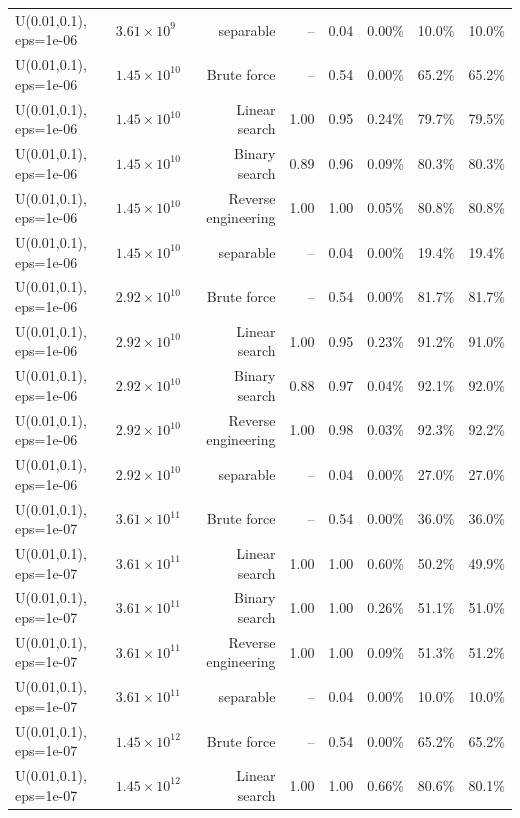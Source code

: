 \begin{tabular}{llrrrrrr}
U(0.01,0.1), eps=1e-06 & $3.61\times 10^{9}$ & separable & -- & 0.04 & 0.00\% & 10.0\% & 10.0\% \\
U(0.01,0.1), eps=1e-06 & $1.45\times 10^{10}$ & Brute force & -- & 0.54 & 0.00\% & 65.2\% & 65.2\% \\
U(0.01,0.1), eps=1e-06 & $1.45\times 10^{10}$ & Linear search & 1.00 & 0.95 & 0.24\% & 79.7\% & 79.5\% \\
U(0.01,0.1), eps=1e-06 & $1.45\times 10^{10}$ & Binary search & 0.89 & 0.96 & 0.09\% & 80.3\% & 80.3\% \\
U(0.01,0.1), eps=1e-06 & $1.45\times 10^{10}$ & Reverse engineering & 1.00 & 1.00 & 0.05\% & 80.8\% & 80.8\% \\
U(0.01,0.1), eps=1e-06 & $1.45\times 10^{10}$ & separable & -- & 0.04 & 0.00\% & 19.4\% & 19.4\% \\
U(0.01,0.1), eps=1e-06 & $2.92\times 10^{10}$ & Brute force & -- & 0.54 & 0.00\% & 81.7\% & 81.7\% \\
U(0.01,0.1), eps=1e-06 & $2.92\times 10^{10}$ & Linear search & 1.00 & 0.95 & 0.23\% & 91.2\% & 91.0\% \\
U(0.01,0.1), eps=1e-06 & $2.92\times 10^{10}$ & Binary search & 0.88 & 0.97 & 0.04\% & 92.1\% & 92.0\% \\
U(0.01,0.1), eps=1e-06 & $2.92\times 10^{10}$ & Reverse engineering & 1.00 & 0.98 & 0.03\% & 92.3\% & 92.2\% \\
U(0.01,0.1), eps=1e-06 & $2.92\times 10^{10}$ & separable & -- & 0.04 & 0.00\% & 27.0\% & 27.0\% \\
U(0.01,0.1), eps=1e-07 & $3.61\times 10^{11}$ & Brute force & -- & 0.54 & 0.00\% & 36.0\% & 36.0\% \\
U(0.01,0.1), eps=1e-07 & $3.61\times 10^{11}$ & Linear search & 1.00 & 1.00 & 0.60\% & 50.2\% & 49.9\% \\
U(0.01,0.1), eps=1e-07 & $3.61\times 10^{11}$ & Binary search & 1.00 & 1.00 & 0.26\% & 51.1\% & 51.0\% \\
U(0.01,0.1), eps=1e-07 & $3.61\times 10^{11}$ & Reverse engineering & 1.00 & 1.00 & 0.09\% & 51.3\% & 51.2\% \\
U(0.01,0.1), eps=1e-07 & $3.61\times 10^{11}$ & separable & -- & 0.04 & 0.00\% & 10.0\% & 10.0\% \\
U(0.01,0.1), eps=1e-07 & $1.45\times 10^{12}$ & Brute force & -- & 0.54 & 0.00\% & 65.2\% & 65.2\% \\
U(0.01,0.1), eps=1e-07 & $1.45\times 10^{12}$ & Linear search & 1.00 & 1.00 & 0.66\% & 80.6\% & 80.1\% \\

\end{tabular}
